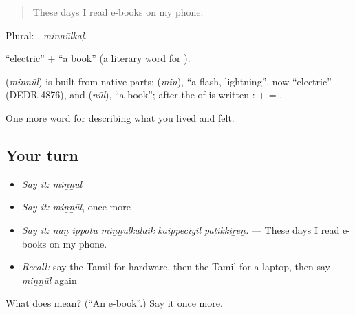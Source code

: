 \begin{quote}
These days I read e-books on my phone.
\end{quote}

Plural: , \emph{miṉṉūlkaḷ}.

 \textquotedblleft{}electric\textquotedblright{} +  \textquotedblleft{}a book\textquotedblright{} (a literary word for ).

\begin{cousinweb}
\textbf{} (\emph{miṉṉūl}) is built from native parts:  (\emph{miṉ}), \textquotedblleft{}a flash, lightning\textquotedblright{}, now \textquotedblleft{}electric\textquotedblright{} (DEDR 4876), and  (\emph{nūl}), \textquotedblleft{}a book\textquotedblright{}; after  the  of  is written :  +  = .
\end{cousinweb}

\begin{grammarlens}[title={What you've built}]
One more word for describing what you lived and felt.
\end{grammarlens}

\subsection*{Your turn}
\begin{itemize}
\raggedright
  \item \emph{Say it:} \emph{miṉṉūl}
  \item \emph{Say it:} \emph{miṉṉūl}, once more
  \item \emph{Say it:} \emph{nāṉ ippōtu miṉṉūlkaḷaik kaippēciyil paṭikkiṟēṉ.} — These days I read e-books on my phone.
  \item \emph{Recall:} say the Tamil for hardware, then the Tamil for a laptop, then say \emph{miṉṉūl} again
\end{itemize}

\begin{tcolorbox}[breakable,colback=teal!4,colframe=teal!35!black,title={Before you move on}]
What does  mean? (\textquotedblleft{}An e-book\textquotedblright{}.) Say it once more.
\end{tcolorbox}
